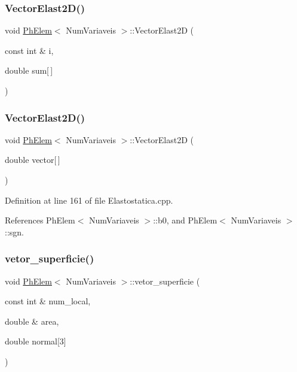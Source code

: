 \subsubsection{\texorpdfstring{Vector\+Elast2\+D()}{VectorElast2D()}\hspace{0.1cm}{\footnotesize\ttfamily [1/2]}}
{\footnotesize\ttfamily void \hyperlink{classPhElem}{Ph\+Elem}$<$ Num\+Variaveis $>$\+::Vector\+Elast2D (\begin{DoxyParamCaption}\item[{const int \&}]{i,  }\item[{double}]{sum\mbox{[}$\,$\mbox{]} }\end{DoxyParamCaption})\hspace{0.3cm}{\ttfamily [inherited]}}

\mbox{\label{classPhElem_a4b130cb327652894d81b2c4e26b96f41}} 
\subsubsection{\texorpdfstring{Vector\+Elast2\+D()}{VectorElast2D()}\hspace{0.1cm}{\footnotesize\ttfamily [2/2]}}
{\footnotesize\ttfamily void \hyperlink{classPhElem}{Ph\+Elem}$<$ Num\+Variaveis $>$\+::Vector\+Elast2D (\begin{DoxyParamCaption}\item[{double}]{vector\mbox{[}$\,$\mbox{]} }\end{DoxyParamCaption})\hspace{0.3cm}{\ttfamily [inherited]}}



Definition at line 161 of file Elastostatica.\+cpp.



References Ph\+Elem$<$ Num\+Variaveis $>$\+::b0, and Ph\+Elem$<$ Num\+Variaveis $>$\+::sgn.

\mbox{\label{classPhElem_a993d5f1b66f6d99ffb95adc9ff882e80}} 
\subsubsection{\texorpdfstring{vetor\+\_\+superficie()}{vetor\_superficie()}}
{\footnotesize\ttfamily void \hyperlink{classPhElem}{Ph\+Elem}$<$ Num\+Variaveis $>$\+::vetor\+\_\+superficie (\begin{DoxyParamCaption}\item[{const int \&}]{num\+\_\+local,  }\item[{double \&}]{area,  }\item[{double}]{normal\mbox{[}3\mbox{]} }\end{DoxyParamCaption})\hspace{0.3cm}{\ttfamily [inherited]}}



